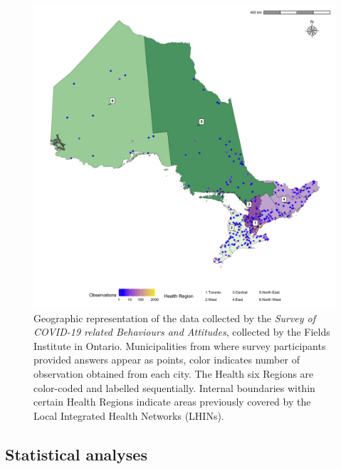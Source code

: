 \documentclass[
]{article}
\begin{document}
\begin{figure}

{\centering \includegraphics[width=1\textwidth,height=1\textheight]{../data/map_data/map_June_01.pdf}

}

\caption{\label{fig-map}Geographic representation of the data collected
by the \emph{Survey of COVID-19 related Behaviours and Attitudes},
collected by the Fields Institute in Ontario. Municipalities from where
survey participants provided answers appear as points, color indicates
number of observation obtained from each city. The Health six Regions
are color-coded and labelled sequentially. Internal boundaries within
certain Health Regions indicate areas previously covered by the Local
Integrated Health Networks (LHINs).}

\end{figure}

\hypertarget{statistical-analyses}{%
\subsection{Statistical analyses}\label{statistical-analyses}}
\end{document}
